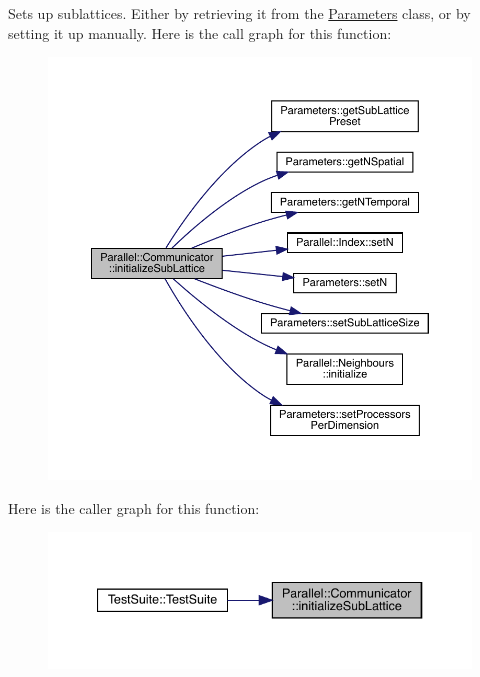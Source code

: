 Sets up sublattices. Either by retrieving it from the \mbox{\hyperlink{class_parameters}{Parameters}} class, or by setting it up manually. Here is the call graph for this function\+:\nopagebreak
\begin{figure}[H]
\begin{center}
\leavevmode
\includegraphics[width=350pt]{class_parallel_1_1_communicator_a3094d713d09225738ecf0250019db115_cgraph}
\end{center}
\end{figure}
Here is the caller graph for this function\+:\nopagebreak
\begin{figure}[H]
\begin{center}
\leavevmode
\includegraphics[width=340pt]{class_parallel_1_1_communicator_a3094d713d09225738ecf0250019db115_icgraph}
\end{center}
\end{figure}
\mbox{\label{class_parallel_1_1_communicator_a57bb28ee8dbc4efd708a2695423778c4}} 
